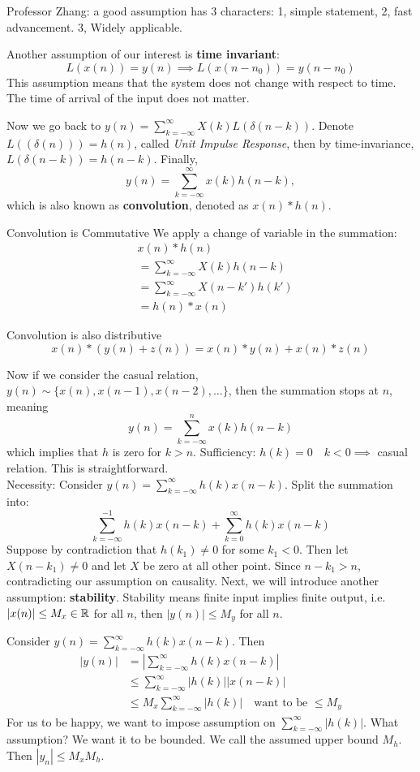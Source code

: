 \documentclass[../main.tex]{subfiles}
\begin{document}
Professor Zhang: a good assumption has 3 characters: 1, simple statement, 2, fast advancement. 3, Widely applicable.

Another assumption of our interest is \textbf{time invariant}: \[
L(x(n))=y(n) \implies L(x(n-n_0)) = y(n-n_0)
\]
This assumption means that the system does not change with respect to time. The time of arrival of the input does not matter.

Now we go back to $y(n) = \sum_{k=-\infty}^\infty X(k) L(\delta(n-k))$. Denote $L((\delta(n)))=h(n)$, called \textit{Unit Impulse Response}, then by time-invariance, $L(\delta(n-k))=h(n-k)$. Finally, \[
y(n) = \sum_{k=-\infty}^\infty x(k) h(n-k),
\]
which is also known as \textbf{convolution}, denoted as $x(n)* h(n)$.
\begin{bbox}{Convolution is Commutative}
We apply a change of variable in the summation:
\begin{align*}
    &x(n) * h(n)\\
    &=\sum_{k=-\infty}^\infty X(k)h(n-k) \\
    &=\sum_{k=-\infty}^\infty X(n-k')h(k')\\
    &= h(n) * x(n)
\end{align*}
\end{bbox}
\begin{bbox}{Convolution is also distributive}
    \[
    x(n) * (y(n)+z(n))=x(n)*y(n)+x(n)*z(n)
    \]
\end{bbox}

Now if we consider the casual relation, $y(n)\sim \{x(n), x(n-1),x(n-2),\dots \}$, then the summation stops at $n$, meaning \[
y(n) = \sum_{k=-\infty}^n x(k) h(n-k)
\]
which implies that $h$ is zero for $k > n$. 
Sufficiency:  $h(k)=0 \quad k < 0\implies$ casual relation. This is straightforward.\\
Necessity: Consider $y(n)=\sum_{k=-\infty}^\infty h(k)x(n-k)$. 
Split the summation into: \[
\sum_{k=-\infty}^{-1} h(k)x(n-k) + \sum_{k=0}^\infty h(k)x(n-k)
\]
Suppose by contradiction that $h(k_1) \neq 0$ for some $k_1 < 0$. Then let $X(n-k_1)\neq 0$ and let $X$ be zero at all other point. Since $n-k_1 >n$, contradicting our assumption on causality.
\vspace{10mm}
\newline
Next, we will introduce another assumption: \textbf{stability}.
Stability means finite input implies finite output, i.e. $|x(n)|\leq M_x\in \mathbb{R}$ for all $n$, then $|y(n)|\leq M_y$ for all $n$.

Consider $y(n)=\sum_{k=-\infty}^\infty h(k)x(n-k)$. Then \begin{align*}
    |y(n)| &= |\sum_{k=-\infty}^\infty h(k)x(n-k)|\\
    &\leq \sum_{k=-\infty}^\infty |h(k)| |x(n-k)|\\
    &\leq M_x \sum_{k=-\infty}^\infty |h(k)| \quad \text{want to be $\leq M_y$}
\end{align*}
For us to be happy, we want to impose assumption on $\sum_{k=-\infty}^\infty |h(k)|$. What assumption? We want it to be bounded. We call the assumed upper bound $M_h$. Then $|y_n|\leq M_x M_h$. 
\end{document}

